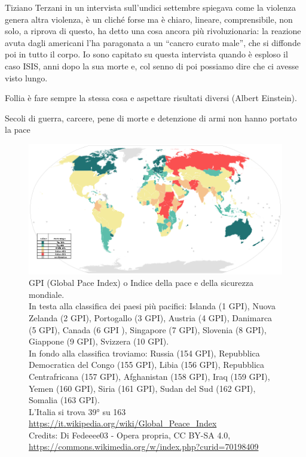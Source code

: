 \documentclass[12pt]{book} %
\begin{document}
Tiziano Terzani in un intervista sull'undici settembre spiegava come la violenza genera altra
violenza, è un cliché forse ma è chiaro, lineare, comprensibile, non solo, a riprova di questo, ha detto una cosa
ancora più rivoluzionaria: la reazione avuta dagli americani l'ha paragonata a un “cancro curato
male”, che si diffonde poi in tutto il corpo. Io sono capitato su questa intervista quando è esploso il caso ISIS, anni
dopo la sua morte e, col senno di poi possiamo dire che ci avesse visto lungo.

Follia è fare sempre la stessa cosa e aspettare risultati diversi (Albert Einstein).

Secoli di guerra, carcere, pene di morte e detenzione di armi non hanno portato la pace

\begin{figure}[H]
  \begin{minipage}{17cm}
    \includegraphics[width=17cm]{images/Libro-img035.png}
    \caption{GPI (Global Pace Index) o Indice della pace e della sicurezza mondiale. \\
In testa alla classifica dei paesi più pacifici: Islanda (1 GPI), Nuova Zelanda (2 GPI), Portogallo (3 GPI), Austria (4
GPI), Danimarca (5 GPI), Canada (6 GPI ), Singapore (7 GPI), Slovenia (8 GPI), Giappone (9 GPI), Svizzera (10 GPI). \\
In fondo alla classifica troviamo: Russia (154 GPI), Repubblica Democratica del Congo (155 GPI), Libia (156 GPI),
Repubblica Centrafricana (157 GPI), Afghanistan (158 GPI), Iraq (159 GPI), Yemen (160 GPI), Siria (161 GPI), Sudan del
Sud (162 GPI), Somalia (163 GPI).\\
L'Italia si trova 39° su 163\\
\protect\url{https://it.wikipedia.org/wiki/Global\_Peace\_Index} \\
Credits: Di Fedeeee03 - Opera propria, CC BY-SA 4.0, \protect\url{https://commons.wikimedia.org/w/index.php?curid=70198409}  }
  \end{minipage}
\end{figure}
\end{document}
